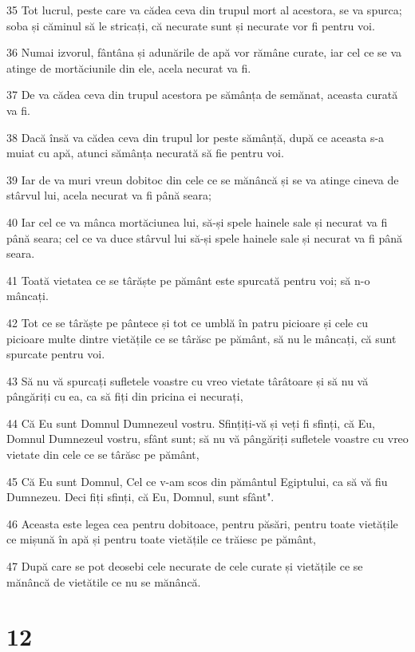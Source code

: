 \par 35 Tot lucrul, peste care va cădea ceva din trupul mort al acestora, se va spurca; soba și căminul să le stricați, că necurate sunt și necurate vor fi pentru voi.
\par 36 Numai izvorul, fântâna și adunările de apă vor rămâne curate, iar cel ce se va atinge de mortăciunile din ele, acela necurat va fi.
\par 37 De va cădea ceva din trupul acestora pe sămânța de semănat, aceasta curată va fi.
\par 38 Dacă însă va cădea ceva din trupul lor peste sămânță, după ce aceasta s-a muiat cu apă, atunci sămânța necurată să fie pentru voi.
\par 39 Iar de va muri vreun dobitoc din cele ce se mănâncă și se va atinge cineva de stârvul lui, acela necurat va fi până seara;
\par 40 Iar cel ce va mânca mortăciunea lui, să-și spele hainele sale și necurat va fi până seara; cel ce va duce stârvul lui să-și spele hainele sale și necurat va fi până seara.
\par 41 Toată vietatea ce se târăște pe pământ este spurcată pentru voi; să n-o mâncați.
\par 42 Tot ce se târăște pe pântece și tot ce umblă în patru picioare și cele cu picioare multe dintre vietățile ce se târăsc pe pământ, să nu le mâncați, că sunt spurcate pentru voi.
\par 43 Să nu vă spurcați sufletele voastre cu vreo vietate târâtoare și să nu vă pângăriți cu ea, ca să fiți din pricina ei necurați,
\par 44 Că Eu sunt Domnul Dumnezeul vostru. Sfințiți-vă și veți fi sfinți, că Eu, Domnul Dumnezeul vostru, sfânt sunt; să nu vă pângăriți sufletele voastre cu vreo vietate din cele ce se târăsc pe pământ,
\par 45 Că Eu sunt Domnul, Cel ce v-am scos din pământul Egiptului, ca să vă fiu Dumnezeu. Deci fiți sfinți, că Eu, Domnul, sunt sfânt".
\par 46 Aceasta este legea cea pentru dobitoace, pentru păsări, pentru toate vietățile ce mișună în apă și pentru toate vietățile ce trăiesc pe pământ,
\par 47 După care se pot deosebi cele necurate de cele curate și vietățile ce se mănâncă de vietătile ce nu se mănâncă.

\chapter{12}

